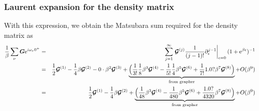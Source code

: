 \documentclass[11pt,a4paper]{report}
\begin{document}
\subsubsection{Laurent expansion for the density matrix}
With this expression, we obtain the Matsubara sum required for the
density matrix as
\begin{eqnarray*}
\frac{1}{\beta}\sum_\nu\bm{G}\mathrm{e}^{i\omega_\nu0^+}
&=&\sum_{j=1}^\infty
\left.\bm{\mathcal{G}}^{(j)}\frac{1}{(j-1)!}
\partial^{j-1}_\epsilon\right|_{\epsilon=0}(1+\mathrm{e}^{\beta\epsilon})^{-1}
\nonumber\\
&=&
\frac{1}{2}\bm{\mathcal{G}}^{(1)}
-\frac{1}{4}\beta\bm{\mathcal{G}}^{(2)}
-0\cdot\beta^2\bm{\mathcal{G}}^{(3)}
+\underbrace{\Bigl(
\frac{1}{3!}\frac{1}{8}\beta^3\bm{\mathcal{G}}^{(4)}
-\frac{1}{5!}\frac{1}{4}\beta^5\bm{\mathcal{G}}^{(6)}
+\frac{1}{7!}1.0?\beta^7\bm{\mathcal{G}}^{(8)}\Bigr)
}_{\text{from grapher}}
+O(\beta^9)
\nonumber\\
&=&
\frac{1}{2}\bm{\mathcal{G}}^{(1)}
-\frac{1}{4}\beta\bm{\mathcal{G}}^{(2)}
+\underbrace{\Bigl(
\frac{1}{48}\beta^3\bm{\mathcal{G}}^{(4)}
-\frac{1}{480}\beta^5\bm{\mathcal{G}}^{(6)}
+\frac{1.0?}{4320}\beta^7\bm{\mathcal{G}}^{(8)}\Bigr)}_{\text{from grapher}}
+O(\beta^9)
\end{eqnarray*}


\end{document}
